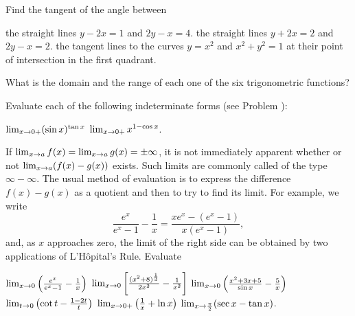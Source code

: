 \begin{exercises}
Find the tangent of the angle between
\begin{exenum}
\x
the straight lines $y-2x=1$ and $2y-x=4$.
\x
the straight lines $y+2x=2$ and $2y-x=2$.
\x
the tangent lines to the curves $y=x^2$
and $x^2+y^2=1$ at their point of
intersection in the first quadrant.
\end{exenum}

What is the domain and the range of each one
of the six trigonometric functions?

Evaluate each of the following indeterminate
forms (see Problem ):
\begin{exenum}
\x
$\lim_{x\rightarrow0+} (\sin x)^{\tan x}$
\x
$\lim_{x\rightarrow0+} x^{1-\cos x}$.
\end{exenum}

If $\lim_{x\rightarrow a} f(x) = \lim_{x\rightarrow a} g(x) =
\pm \infty$,
it is not immediately apparent whether or not
$\lim_{x\rightarrow a} (f(x)-g(x))$ exists.
Such limits are commonly called
 of the type
$\infty - \infty$.
The usual method of evaluation is to express the
difference $f(x) - g(x)$ as a quotient and then to
try to find its limit.
For example, we write
\[
\frac{e^x}{e^x-1} - \frac1x =
\frac{xe^x - (e^x-1)}{x(e^x - 1)}
,
\]
and, as $x$ approaches zero, the limit of the right
side can be obtained by two applications of
L'H\^opital's Rule.  Evaluate
\begin{exenum}
\x
$\lim_{x\rightarrow0} \left(\frac{e^x}{e^x-1} - \frac1x\right)$
\x
$\lim_{x\rightarrow0} \left[\frac{(x^2+8)^{\frac13}}
{2x^2} - \frac1{x^2}\right]$
\x
$\lim_{x\rightarrow0} \left(\frac{x^2+3x+5}
{\sin x} - \frac5x\right)$
\x
$\lim_{t\rightarrow0} \left(\cot t - \frac{1-2t}t\right)$
\x
$\lim_{x\rightarrow0+} \left(\frac1x + \ln x\right)$
\x
$\lim_{x\rightarrow\frac{\pi}2} (\sec x - \tan x)$.
\end{exenum}

\end{exercises}
